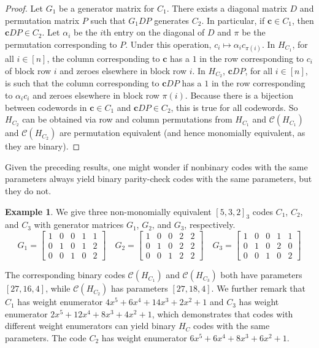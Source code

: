 \documentclass[11pt]{amsart}
\theoremstyle{definition}
\newtheorem{example}[theorem]{Example}
\newcommand{\0}{\mathbf{0}}
\begin{document}
\begin{proof}
    Let $G_1$ be a generator matrix for $C_1$. There exists a diagonal matrix $D$ and permutation matrix $P$ such that $G_1 D P$ generates $C_2$. In particular, if $\mathbf{c} \in C_1$, then $\mathbf{c} D P \in C_2$. Let $\alpha_i$ be the $i$th entry on the  diagonal of $D$ and $\pi$ be the permutation corresponding to $P$. Under this operation, $c_i \mapsto \alpha_i c_{\pi(i)}$. In $H_{C_1}$, for all $i \in [n]$, the column corresponding to $\mathbf{c}$ has a $1$ in the row corresponding to $c_i$ of block row $i$ and zeroes elsewhere in block row $i$. In $H_{C_2}$, $\mathbf{c}DP$, for all $i \in [n]$, is such that the column corresponding to $\mathbf{c}DP$ has a $1$ in the row corresponding to $\alpha_i c_i$ and zeroes elsewhere in block row $\pi(i)$. Because there is a bijection between codewords in $\mathbf{c} \in C_1$ and $\mathbf{c}DP \in C_2$, this is true for all codewords. So $H_{C_2}$ can be obtained via row and column permutations from $H_{C_1}$ and $\mathcal{C}({H_{C_1}})$ and $\mathcal{C}({H_{C_2}})$ are permutation equivalent (and hence monomially equivalent, as they are binary).
\end{proof}

Given the preceding results, one might wonder if nonbinary codes with the same parameters always yield binary parity-check codes with the same parameters, but they do not. 

\begin{example}
We give three non-monomially equivalent $[5,3,2]_3$ codes $C_1$, $C_2$, and $C_3$ with generator matrices $G_1$, $G_2$, and $G_3$, respectively.
\[ G_1=\begin{bmatrix}
    1&0&0&1&1\\
    0&1&0&1&2\\
    0&0&1&0&2 
\end{bmatrix} \quad 
G_2 = \begin{bmatrix}
    1&0&0&2&2\\
    0&1&0&2&2\\
    0&0&1&2&2     
\end{bmatrix} \quad
G_3 = \begin{bmatrix}
    1&0&0&1&1\\
    0&1&0&2&0\\
    0&0&1&0&2
\end{bmatrix}\]

The corresponding binary codes $\mathcal{C}(H_{C_1})$ and $\mathcal{C}(H_{C_3})$ both have parameters $[27,16,4]$, while $\mathcal{C}(H_{C_2})$ has parameters $[27,18,4]$. We further remark that $C_1$ has weight enumerator $4x^5+6x^4+14x^3+2x^2+1$ and $C_3$ has weight enumerator $2x^5+12x^4+8x^3+4x^2+1$, which demonstrates that codes with different weight enumerators can yield binary $H_C$ codes with the same parameters. The code $C_2$ has weight enumerator $6x^5+6x^4+8x^3+6x^2+1$. 
\end{example}
\end{document}
